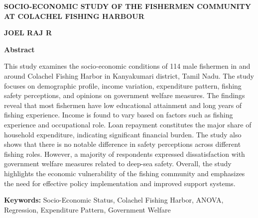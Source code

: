 \documentclass[11pt, a4paper, oneside, openright]{book}
\begin{document}
\thispagestyle{plain}
\begin{center}
	\textbf{SOCIO-ECONOMIC STUDY OF THE FISHERMEN COMMUNITY AT COLACHEL FISHING HARBOUR}
	
	\vspace{0.3cm}
	
	\textbf{JOEL RAJ R}
	
	\vspace{0.4cm}
	\textbf{\Large Abstract}
\end{center} 
{\doublespacing
\qquad 

This study examines the socio-economic conditions of 114 male fishermen in and around Colachel Fishing Harbor in Kanyakumari district, Tamil Nadu. The study focuses on demographic profile, income variation, expenditure pattern, fishing safety perceptions, and opinions on government welfare measures.
The findings reveal that most fishermen have low educational attainment and long years of fishing experience. Income is found to vary based on factors such as fishing experience and occupational role. Loan repayment constitutes the major share of household expenditure, indicating significant financial burden. The study also shows that there is no notable difference in safety perceptions across different fishing roles. However, a majority of respondents expressed dissatisfaction with government welfare measures related to deep-sea safety. Overall, the study highlights the economic vulnerability of the fishing community and emphasizes the need for effective policy implementation and improved support systems.

\vspace{0.2cm}
\noindent
\textbf{Keywords:} Socio-Economic Status, Colachel Fishing Harbor, ANOVA, Regression, Expenditure Pattern, Government Welfare

}
\clearpage %
\end{document}
